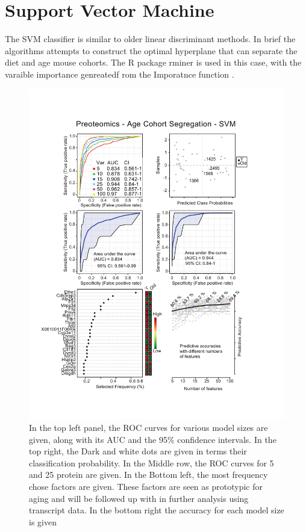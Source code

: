 \documentclass[a4paper,11pt,twoside]{book}
\begin{document}
	\clearpage
	\section{Support Vector Machine}
	
	The SVM classifier is similar to older linear discriminant methods. In brief the algorithms attempts to construct the optimal hyperplane that can separate the diet and age mouse cohorts\citep{Shawe-Taylor2011SVM}. The R package rminer is used in this case, with the varaible importance genreatedf rom the Imporatnce function \citep{Cortez2016}.
	
	\begin{figure}[htb!]
		\centering
		\includegraphics[width=1.1\linewidth]{"3.Proteomics/Proteomics_Vingette_SVM_Age"}
        \caption[SVM Classifier for Young and Old Mice using Proteins]{In the top left panel, the ROC curves for various model sizes are given, along with its AUC and the 95\% confidence intervals. In the top right, the Dark and white dots are given in terms their classification probability. In the Middle row, the ROC curves for 5 and 25 protein are given. In the Bottom left, the most frequency chose factors are given. These factors are seen as prototypic for aging and will be followed up with in further analysis using transcript data. In the bottom right the accuracy for each model size is given} 
		\label{fig:proteomicsvingettesvm}
	\end{figure}
	
\end{document}
